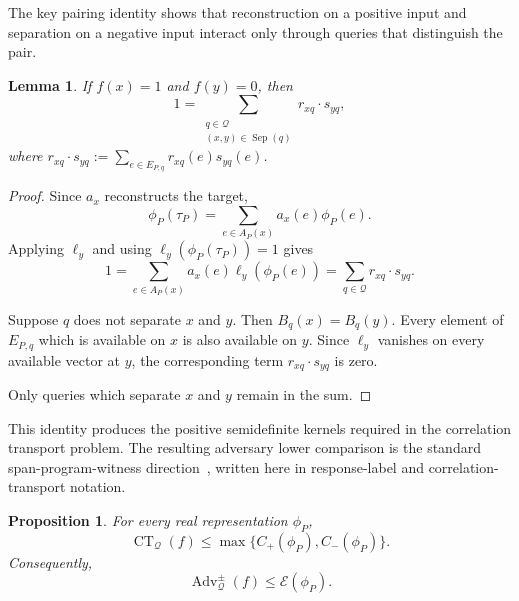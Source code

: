 \documentclass[11pt]{article}
\numberwithin{equation}{section}
\newtheorem{proposition}[definition]{Proposition}
\newtheorem{lemma}[definition]{Lemma}
\theoremstyle{remark}
\begin{document}
The key pairing identity shows that reconstruction on a positive input and
separation on a negative input interact only through queries that distinguish
the pair.

\begin{lemma}
\label{lem:reconstruction-separation-pairing}
If $f(x)=1$ and $f(y)=0$, then
\begin{equation}
    1
    =
    \sum_{\substack{q\in\mathcal Q\\
                    (x,y)\in\operatorname{Sep}(q)}}
        r_{xq}\mathbin{\cdot}s_{yq},
\end{equation}
where
$r_{xq}\mathbin{\cdot}s_{yq}:=\sum_{e\in E_{P,q}}r_{xq}(e)s_{yq}(e)$.
\end{lemma}

\begin{proof}
Since $a_x$ reconstructs the target,
\begin{equation}
    \phi_P(\tau_P)
    =
    \sum_{e\in A_P(x)}
        a_x(e)\phi_P(e).
\end{equation}
Applying $\ell_y$ and using
$\ell_y(\phi_P(\tau_P))=1$ gives
\begin{equation}
    1
    =
    \sum_{e\in A_P(x)}
        a_x(e)\ell_y(\phi_P(e))
    =
    \sum_{q\in\mathcal Q}
        r_{xq}\mathbin{\cdot}s_{yq}.
\end{equation}

Suppose $q$ does not separate $x$ and $y$. Then
$B_q(x)=B_q(y)$. Every element of $E_{P,q}$ which is available on $x$
is also available on $y$. Since $\ell_y$ vanishes on every
available vector at $y$, the corresponding term
$r_{xq}\mathbin{\cdot}s_{yq}$ is zero.

Only queries which separate $x$ and $y$ remain in the sum.
\end{proof}

This identity produces the positive semidefinite kernels required in the
correlation transport problem. The resulting adversary lower comparison is
the standard span-program-witness direction~\cite{Reichardt2009,Reichardt2014Equivalent},
written here in response-label and correlation-transport notation.

\begin{proposition}
\label{prop:represented-program-gives-transport}
For every real representation $\phi_P$,
\begin{equation}
    \operatorname{CT}_{\mathcal Q}(f)
    \leq
    \max
    \{
        C_+(\phi_P),
        C_-(\phi_P)
    \}.
\end{equation}
Consequently,
\begin{equation}
    \operatorname{Adv}^{\pm}_{\mathcal Q}(f)
    \leq
    \mathcal E(\phi_P).
\end{equation}
\end{proposition}
\end{document}

